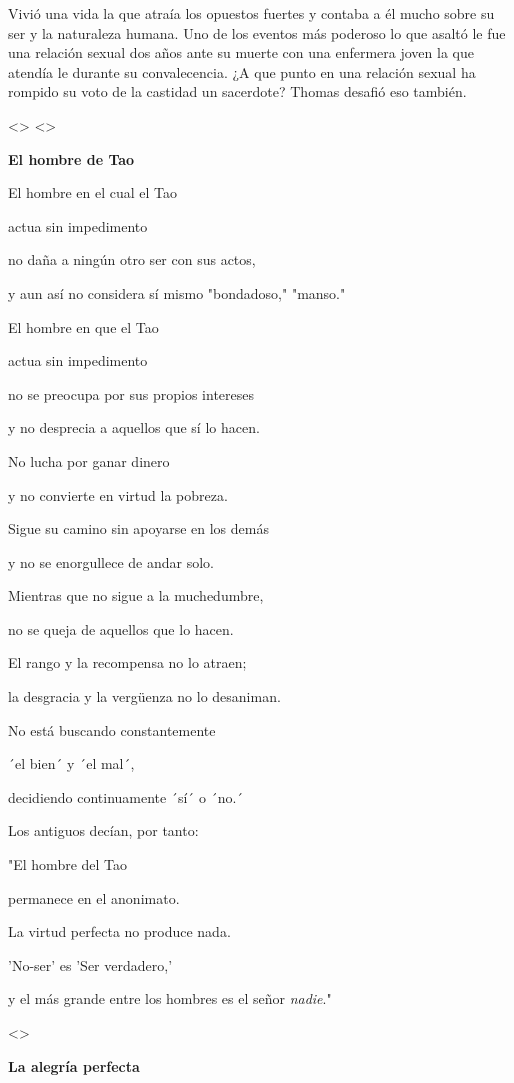 Vivió una vida la que atraía los opuestos fuertes y contaba a él mucho
sobre su ser y la naturaleza humana. Uno de los eventos más poderoso lo
que asaltó le fue una relación sexual dos años ante su muerte con una
enfermera joven la que atendía le durante su convalecencia. ¿A que punto
en una relación sexual ha rompido su voto de la castidad un sacerdote?
Thomas desafió eso también.

\textless\textgreater{} \textless\textgreater{}

\textbf{{El hombre de Tao}}

El hombre en el cual el Tao

actua sin impedimento

no daña a ningún otro ser con sus actos,

y aun así no considera sí mismo "bondadoso," "manso."

El hombre en que el Tao

actua sin impedimento

no se preocupa por sus propios intereses

y no desprecia a aquellos que sí lo hacen.

No lucha por ganar dinero

y no convierte en virtud la pobreza.

Sigue su camino sin apoyarse en los demás

y no se enorgullece de andar solo.

Mientras que no sigue a la muchedumbre,

no se queja de aquellos que lo hacen.

El rango y la recompensa no lo atraen;

la desgracia y la vergüenza no lo desaniman.

No está buscando constantemente

´el bien´ y ´el mal´,

decidiendo continuamente ´sí´ o ´no.´

Los antiguos decían, por tanto:

"El hombre del Tao

permanece en el anonimato.

La virtud perfecta no produce nada.

'No-ser' es 'Ser verdadero,'

y el más grande entre los hombres es el señor \emph{nadie}."

\textless\textgreater{}

\textbf{{La alegría perfecta}}

